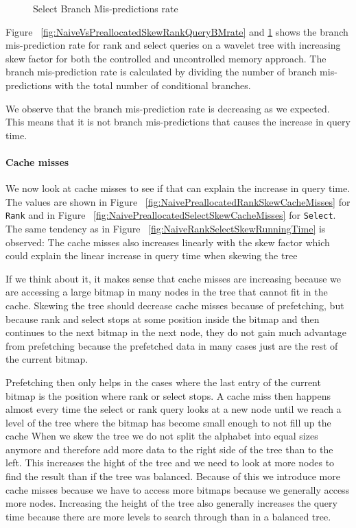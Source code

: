 \begin{figure}
\caption{Select Branch Mis-predictions rate}
\label{fig:NaiveVsPreallocatedSkewSelectQueryBMrate}

\end{figure}
 
Figure ~\ref{fig:NaiveVsPreallocatedSkewRankQueryBMrate} and \ref{fig:NaiveVsPreallocatedSkewSelectQueryBMrate} shows the branch mis-prediction rate for rank and select queries on a wavelet tree with increasing skew factor for both the controlled and uncontrolled memory approach. 
The branch mis-prediction rate is calculated by dividing the number of branch mis-predictions with the total number of conditional branches.

We observe that the branch mis-prediction rate is decreasing as we expected. 
This means that it is not branch mis-predictions that causes the increase in query time. 


\paragraph{Cache misses}
We now look at cache misses to see if that can explain the increase in query time. 
The values are shown in Figure ~\ref{fig:NaivePreallocatedRankSkewCacheMisses} for \texttt{Rank} and in Figure ~\ref{fig:NaivePreallocatedSelectSkewCacheMisses} for \texttt{Select}.
The same tendency as in Figure ~\ref{fig:NaiveRankSelectSkewRunningTime} is observed: 
The cache misses also increases linearly with the skew factor which could explain the linear increase in query time when skewing the tree

If we think about it, it makes sense that cache misses are increasing because we are accessing a large bitmap in many nodes in the tree that cannot fit in the cache.
Skewing the tree should decrease cache misses because of prefetching, but because rank and select stops at some position inside the bitmap and then continues to the next bitmap in the next node, they do not gain much advantage from prefetching because the prefetched data in many cases just are the rest of the current bitmap. 

Prefetching then only helps in the cases where the last entry of the current bitmap is the position where rank or select stops.
A cache miss then happens almost every time the select or rank query looks at a new node until we reach a level of the tree where the bitmap has become small enough to not fill up the cache
When we skew the tree we do not split the alphabet into equal sizes anymore and therefore add more data to the right side of the tree than to the left. 
This increases the hight of the tree and we need to look at more nodes to find the result than if the tree was balanced.
Because of this we introduce more cache misses because we have to access more bitmaps because we generally access more nodes.
Increasing the height of the tree also generally increases the query time because there are more levels to search through than in a balanced tree.


